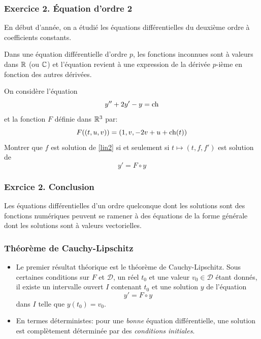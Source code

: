 \begin{frame}
  \frametitle{Exercice 2. \'Equation d'ordre 2}
En début d'année, on a étudié les équations différentielles du deuxième ordre à coefficients constants. 

Dans une équation différentielle d'ordre $p$, les fonctions inconnues sont à valeurs dans $\mathbb{R}$ (ou $\mathbb{C}$) et l'équation revient à une expression de la dérivée $p$-ième en fonction des autres dérivées.

On considère l'équation
\begin{equation}
  y'' + 2y' - y = \mathop{\mathrm{ch}}
  \label{lin2}
\end{equation}
et la fonction $F$ définie dans $\mathbb{R}^3$ par:
\begin{displaymath}
  F((t,u,v)) = (1,v,-2v+u+\mathop{\mathrm{ch}}(t))
\end{displaymath}
Montrer que $f$ est solution de \eqref{lin2} si et seulement si $t\mapsto(t,f,f')$ est solution de 
\begin{equation*}
  y' = F\circ y
\end{equation*}  
\end{frame}

\begin{frame}
  \frametitle{Exrcice 2. Conclusion}

Les équations différentielles d'un ordre quelconque dont les solutions sont des fonctions numériques peuvent se ramener à des équations de la forme générale dont les solutions sont à valeurs vectorielles.
\end{frame}

\begin{frame}
  \frametitle{Théorème de Cauchy-Lipschitz}
\begin{itemize}
  \item Le premier résultat théorique est le théorème de Cauchy-Lipschitz.\newline
  Sous certaines conditions sur $F$ et $\mathcal{D}$, un réel $t_0$ et une valeur $v_0\in \mathcal{D}$ étant donnés, il existe un intervalle ouvert $I$ contenant $t_0$ et une solution $y$ de l'équation
\begin{equation*}
  y' = F\circ y
\end{equation*}  
dans $I$ telle que $y(t_0)=v_0$.
  \item  En termes déterministes: pour une \emph{bonne} équation différentielle, une solution est complètement déterminée par des \emph{conditions initiales}.
\end{itemize}
\end{frame}

